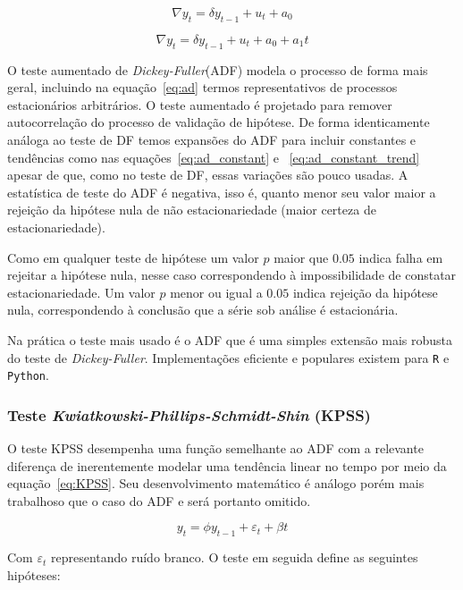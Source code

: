 \begin{equation}\label{eq:ad_constant}
    \nabla y_t = \delta y_{t-1} + u_t + a_0
\end{equation}

\begin{equation}\label{eq:ad_constant_trend}
    \nabla y_t = \delta y_{t-1} + u_t + a_0 + a_1 t
\end{equation}

O teste aumentado de \emph{Dickey-Fuller}(ADF) modela o processo de forma mais
geral, incluindo na equação~\ref{eq:ad} termos representativos de processos
estacionários arbitrários. O teste aumentado é projetado para remover
autocorrelação do processo de validação de hipótese. De forma identicamente
análoga ao teste de DF temos expansões do ADF para incluir constantes e
tendências como nas equações~\ref{eq:ad_constant} e
~\ref{eq:ad_constant_trend} apesar de que, como no teste de DF, essas
variações são pouco usadas. A estatística de teste do ADF é negativa, isso é,
quanto menor seu valor maior a rejeição da hipótese nula de não
estacionariedade (maior certeza de estacionariedade).

Como em qualquer teste de hipótese um valor $p$ maior que $0.05$ indica falha
em rejeitar a hipótese nula, nesse caso correspondendo à impossibilidade de
constatar estacionariedade. Um valor $p$ menor ou igual a $0.05$ indica
rejeição da hipótese nula, correspondendo à conclusão que a série sob análise
é estacionária.

Na prática o teste mais usado é o ADF que é uma simples extensão mais robusta
do teste de \emph{Dickey-Fuller}. Implementações eficiente e populares existem
para \verb+R+ e \verb+Python+.

\subsubsection{Teste \emph{Kwiatkowski-Phillips-Schmidt-Shin} (KPSS)}

O teste KPSS desempenha uma função semelhante ao ADF com a relevante
diferença de inerentemente modelar uma tendência linear no tempo por meio da
equação~\ref{eq:KPSS}. Seu desenvolvimento matemático é análogo porém mais
trabalhoso que o caso do ADF e será portanto omitido.

\begin{equation}\label{eq:KPSS}
    y_t = \phi y_{t-1} + \varepsilon_t + \beta t
\end{equation}

Com $\varepsilon_t$ representando ruído branco. O teste em seguida define as
seguintes hipóteses:

